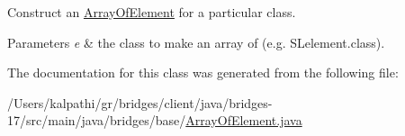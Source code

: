 Construct an \mbox{\hyperlink{classbridges_1_1base_1_1_array_of_element}{Array\+Of\+Element}} for a particular class. 
\begin{DoxyParams}{Parameters}
{\em e} & the class to make an array of (e.\+g. S\+Lelement.\+class). \\
\hline
\end{DoxyParams}


The documentation for this class was generated from the following file\+:\begin{DoxyCompactItemize}
\item 
/\+Users/kalpathi/gr/bridges/client/java/bridges-\/17/src/main/java/bridges/base/\mbox{\hyperlink{_array_of_element_8java}{Array\+Of\+Element.\+java}}\end{DoxyCompactItemize}
